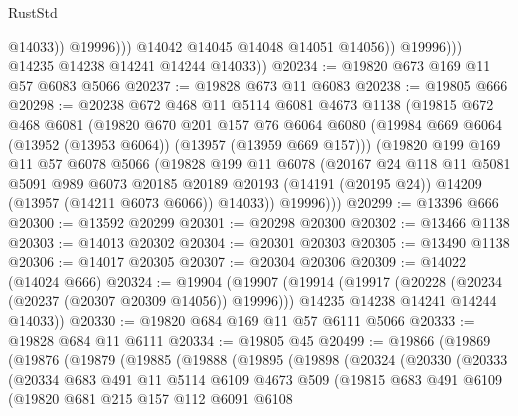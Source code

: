 \begin{lexlean}{RustStd}
\begin{coremodule}
                            @14033))
                        @19996)))
                  @14042
                  @14045
                  @14048
                  @14051
                  @14056))
              @19996)))
        @14235
        @14238
        @14241
        @14244
        @14033))
@20234 := @19820 @673 @169 @11 @57 @6083 @5066
@20237 := @19828 @673 @11 @6083
@20238 := @19805 @666
@20298 := @20238
    @672
    @468
    @11
    @5114
    @6081
    @4673
    @1138
    (@19815
      @672
      @468
      @6081
      (@19820
        @670
        @201
        @157
        @76
        @6064
        @6080
        (@19984 @669 @6064 (@13952 (@13953 @6064)) (@13957 (@13959 @669 @157)))
        (@19820
          @199
          @169
          @11
          @57
          @6078
          @5066
          (@19828
            @199
            @11
            @6078
            (@20167
              @24
              @118
              @11
              @5081
              @5091
              @989
              @6073
              @20185
              @20189
              @20193
              (@14191 (@20195 @24))
              @14209
              (@13957 (@14211 @6073 @6066))
              @14033))
          @19996)))
@20299 := @13396 @666
@20300 := @13592 @20299
@20301 := @20298 @20300
@20302 := @13466 @1138
@20303 := @14013 @20302
@20304 := @20301 @20303
@20305 := @13490 @1138
@20306 := @14017 @20305
@20307 := @20304 @20306
@20309 := @14022 (@14024 @666)
@20324 := @19904
    (@19907
      (@19914
        (@19917 (@20228 (@20234 (@20237 (@20307 @20309 @14056)) @19996)))
        @14235
        @14238
        @14241
        @14244
        @14033))
@20330 := @19820 @684 @169 @11 @57 @6111 @5066
@20333 := @19828 @684 @11 @6111
@20334 := @19805 @45
@20499 := @19866
    (@19869
      (@19876
        (@19879
          (@19885
            (@19888
              (@19895
                (@19898
                  (@20324
                    (@20330
                      (@20333
                        (@20334
                          @683
                          @491
                          @11
                          @5114
                          @6109
                          @4673
                          @509
                          (@19815
                            @683
                            @491
                            @6109
                            (@19820
                              @681
                              @215
                              @157
                              @112
                              @6091
                              @6108

\end{coremodule}
\end{lexlean}

